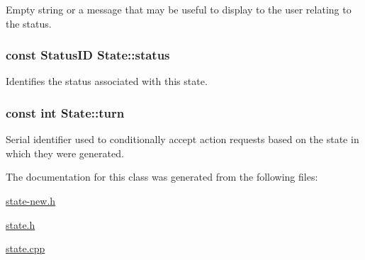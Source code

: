 Empty string or a message that may be useful to display to the user relating to the status. 

\hypertarget{classState_75d3a38b16f7081c4e961f6e7e2708b7}{
\subsubsection[{status}]{\setlength{\rightskip}{0pt plus 5cm}const {\bf StatusID} {\bf State::status}}}
\label{classState_75d3a38b16f7081c4e961f6e7e2708b7}


Identifies the status associated with this state. 

\hypertarget{classState_97418aee9e2f52608a6ab606c4594aff}{
\subsubsection[{turn}]{\setlength{\rightskip}{0pt plus 5cm}const int {\bf State::turn}}}
\label{classState_97418aee9e2f52608a6ab606c4594aff}


Serial identifier used to conditionally accept action requests based on the state in which they were generated. 



The documentation for this class was generated from the following files:\begin{CompactItemize}
\item 
\hyperlink{state-new_8h}{state-new.h}\item 
\hyperlink{state_8h}{state.h}\item 
\hyperlink{state_8cpp}{state.cpp}\end{CompactItemize}
